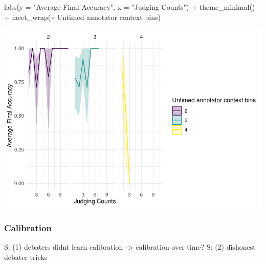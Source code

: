 \documentclass[
]{article}
\newenvironment{Shaded}{\begin{snugshade}}{\end{snugshade}}
\newcommand{\AttributeTok}[1]{\textcolor[rgb]{0.77,0.63,0.00}{#1}}
\newcommand{\FunctionTok}[1]{\textcolor[rgb]{0.00,0.00,0.00}{#1}}
\newcommand{\NormalTok}[1]{#1}
\newcommand{\SpecialCharTok}[1]{\textcolor[rgb]{0.00,0.00,0.00}{#1}}
\newcommand{\StringTok}[1]{\textcolor[rgb]{0.31,0.60,0.02}{#1}}
\begin{document}
\begin{Shaded}
\begin{Highlighting}[]
  \FunctionTok{labs}\NormalTok{(}\AttributeTok{y =} \StringTok{"Average Final Accuracy"}\NormalTok{, }\AttributeTok{x =} \StringTok{"Judging Counts"}\NormalTok{) }\SpecialCharTok{+}
  \FunctionTok{theme\_minimal}\NormalTok{() }\SpecialCharTok{+}
  \FunctionTok{facet\_wrap}\NormalTok{(}\SpecialCharTok{\textasciitilde{}} \StringTok{\textasciigrave{}}\AttributeTok{Untimed annotator context bins}\StringTok{\textasciigrave{}}\NormalTok{)}
\end{Highlighting}
\end{Shaded}

\includegraphics[width=1\linewidth]{debate-2309_files/figure-latex/unnamed-chunk-2-2}

\hypertarget{calibration}{%
\subsubsection{Calibration}\label{calibration}}

S: (1) debaters didnt learn calibration -\textgreater{} calibration over
time? S: (2) dishonest debater tricks
\end{document}
